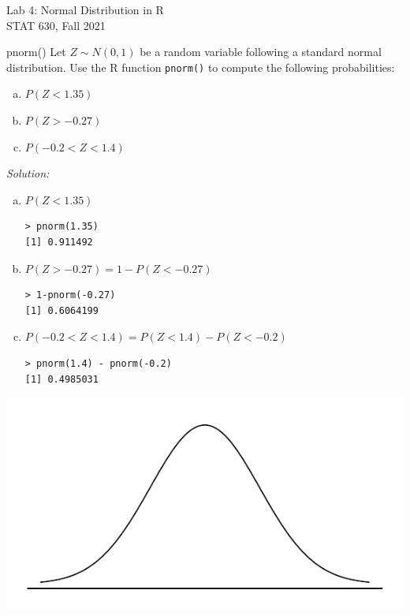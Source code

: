 \documentclass[10pt]{beamer}
\begin{document}
\begin{frame}
\centering
\large
Lab 4: Normal Distribution in R\\
STAT 630, Fall 2021
\end{frame}

\begin{frame}{pnorm()}
Let $Z \sim N(0,1)$ be a random variable following a standard normal distribution.  Use the R function \texttt{pnorm()} to compute the following probabilities:\\

\begin{enumerate}[(a)]
\item $P(Z < 1.35)$
\item $P(Z > -0.27)$
\item $P(-0.2 < Z < 1.4)$
\end{enumerate}
\end{frame}

\begin{frame}[fragile]{}
\emph{Solution:}
\begin{enumerate}[(a)]
\item $P(Z < 1.35)$
\begin{verbatim}
> pnorm(1.35)
[1] 0.911492
\end{verbatim}
\medskip
\item $P(Z > -0.27) = 1-P(Z<-0.27)$
\begin{verbatim}
> 1-pnorm(-0.27)
[1] 0.6064199
\end{verbatim}
\medskip
\item $P(-0.2 < Z < 1.4) = P(Z < 1.4) - P(Z < -0.2)$
\begin{verbatim}
> pnorm(1.4) - pnorm(-0.2)
[1] 0.4985031
\end{verbatim}
\end{enumerate}
\includegraphics[scale=0.5, right]{figure/norm_draw.pdf}
\vspace{0.25cm}
\end{frame}
\end{document}
